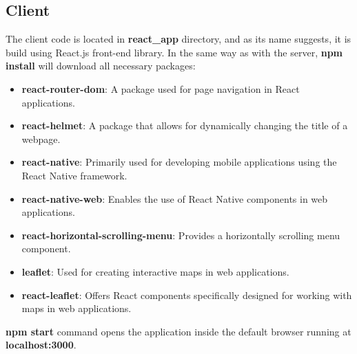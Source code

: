 \documentclass[12pt]{article}
\begin{document}
\subsection{Client}
\label{sec:org6d294e7}
The client code is located in \textbf{react\_app} directory, and as its name suggests, it is build using React.js front-end library. In the same way as with the server, \textbf{npm install} will download all necessary packages:
\begin{itemize}
\item \textbf{react-router-dom}: A package used for page navigation in React applications.
\item \textbf{react-helmet}: A package that allows for dynamically changing the title of a webpage.
\item \textbf{react-native}: Primarily used for developing mobile applications using the React Native framework.
\item \textbf{react-native-web}: Enables the use of React Native components in web applications.
\item \textbf{react-horizontal-scrolling-menu}: Provides a horizontally scrolling menu component.
\item \textbf{leaflet}: Used for creating interactive maps in web applications.
\item \textbf{react-leaflet}: Offers React components specifically designed for working with maps in web applications.
\end{itemize}
\textbf{npm start} command opens the application inside the default browser running at \textbf{localhost:3000}.

\newpage
\end{document}
